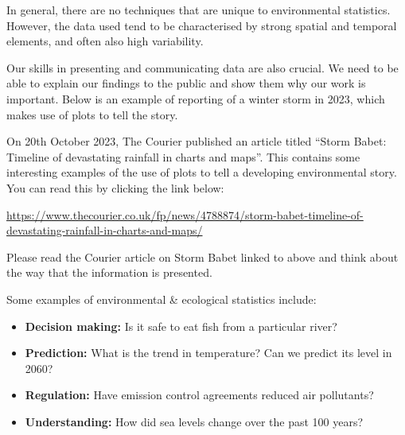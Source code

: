 \documentclass[
  letterpaper,
  DIV=11,
  numbers=noendperiod]{scrartcl}
\providecommand{\tightlist}{%
  \setlength{\itemsep}{0pt}\setlength{\parskip}{0pt}}\usepackage{longtable,booktabs,array}
\begin{document}
In general, there are no techniques that are unique to environmental
statistics. However, the data used tend to be characterised by strong
spatial and temporal elements, and often also high variability.

Our skills in presenting and communicating data are also crucial. We
need to be able to explain our findings to the public and show them why
our work is important. Below is an example of reporting of a winter
storm in 2023, which makes use of plots to tell the story.

\begin{tcolorbox}[enhanced jigsaw, breakable, bottomrule=.15mm, toprule=.15mm, colbacktitle=quarto-callout-note-color!10!white, bottomtitle=1mm, arc=.35mm, opacitybacktitle=0.6, titlerule=0mm, colframe=quarto-callout-note-color-frame, toptitle=1mm, title={The Courier article on Storm Babet}, rightrule=.15mm, leftrule=.75mm, left=2mm, colback=white, opacityback=0, coltitle=black]

On 20th October 2023, The Courier published an article titled ``Storm
Babet: Timeline of devastating rainfall in charts and maps''. This
contains some interesting examples of the use of plots to tell a
developing environmental story. You can read this by clicking the link
below:

\url{https://www.thecourier.co.uk/fp/news/4788874/storm-babet-timeline-of-devastating-rainfall-in-charts-and-maps/}

\end{tcolorbox}

\begin{tcolorbox}[enhanced jigsaw, breakable, bottomrule=.15mm, toprule=.15mm, colbacktitle=quarto-callout-tip-color!10!white, bottomtitle=1mm, arc=.35mm, opacitybacktitle=0.6, titlerule=0mm, colframe=quarto-callout-tip-color-frame, toptitle=1mm, title={Exercise 3}, rightrule=.15mm, leftrule=.75mm, left=2mm, colback=white, opacityback=0, coltitle=black]

Please read the Courier article on Storm Babet linked to above and think
about the way that the information is presented.

\end{tcolorbox}

Some examples of environmental \& ecological statistics include:

\begin{itemize}
\tightlist
\item
  \textbf{Decision making:} Is it safe to eat fish from a particular
  river?
\item
  \textbf{Prediction:} What is the trend in temperature? Can we predict
  its level in 2060?
\item
  \textbf{Regulation:} Have emission control agreements reduced air
  pollutants?
\item
  \textbf{Understanding:} How did sea levels change over the past 100
  years?
\end{itemize}
\end{document}

